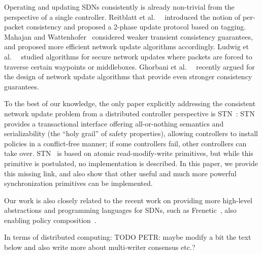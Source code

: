 \documentclass[conference]{sigcomm-alternate}
\begin{document}
Operating and updating SDNs consistently is already non-trivial
from the perspective of a single controller. Reitblatt et al.~~\cite{network-update} 
introduced the notion of
per-packet consistency and proposed a 2-phase update protocol based on tagging.
Mahajan and Wattenhofer~\cite{roger-hotnets} considered weaker transient
consistency guarantees, and proposed more efficient network update algorithms
accordingly. Ludwig et al.~~\cite{hotnets14update} studied algorithms for secure
network updates where packets are forced to traverse certain waypoints or
middleboxes. Ghorbani et al.~~\cite{correct-virt} recently argued for the design
of network update algorithms that provide even stronger consistency guarantees.

To the best of our knowledge, the only paper explicitly addressing the consistent
network update problem from a distributed controller perspective is STN~\cite{stn}:
STN provides a transactional interface offering all-or-nothing semantics and serializability
(the ``holy grail'' of safety properties), 
allowing
controllers to install policies in a conflict-free manner; if some controllers fail,
other controllers can take over. STN~\cite{stn} is based on 
atomic
read-modify-write primitives, but while this primitive is postulated, no implementation is
described. In this paper, we provide this missing link, and also show that other useful and
much more powerful synchronization primitives can be implemented. 

Our work is also closely related to the recent work on providing more high-level
abstractions and programming languages for SDNs, such as Frenetic~\cite{frenetic}, 
also enabling policy composition~\cite{pyretic}.  

In terms of distributed computing: TODO PETR: maybe modify a bit the text below
and also write more about multi-writer consensus etc.?
\end{document}
